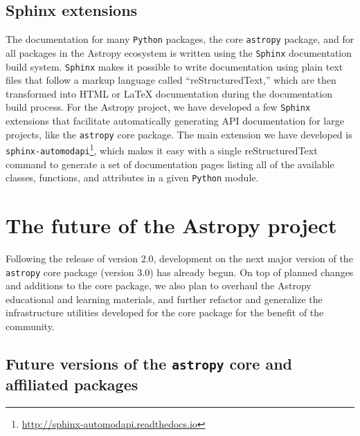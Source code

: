 \documentclass[modern]{aastex61}
\newcommand{\package}[1]{\texttt{#1}\xspace}
\newcommand{\python}{\package{Python}}
\newcommand{\astropy}{Astropy\xspace}
\newcommand{\astropypkg}{\package{astropy}}
\newcommand{\inlinecomment}[2]{\todo[inline]{#1: #2}\xspace}
\begin{document}
\subsection{Sphinx extensions}

The documentation for many \python packages, the core \astropypkg package, and
for all packages in the \astropy ecosystem is written using the
\package{Sphinx} documentation build system.
\package{Sphinx} makes it possible to write documentation using plain text files
that follow a markup language called ``reStructuredText,'' which are then
transformed into HTML or \LaTeX{} documentation during the documentation build
process.
For the \astropy project, we have developed a few \package{Sphinx} extensions
that facilitate automatically generating API documentation for large projects,
like the \astropypkg core package.
The main extension we have developed is
\package{sphinx-automodapi}\footnote{\url{http://sphinx-automodapi.readthedocs.io}},
which makes it easy with a single reStructuredText command to generate a set of
documentation pages listing all of the available classes, functions, and
attributes in a given \python module.



\section{The future of the Astropy project}
\label{sec:future}

Following the release of version 2.0, development on the next major version of
the \astropypkg core package (version 3.0) has already begun.
On top of planned changes and additions to the core package, we also plan to
overhaul the \astropy educational and learning materials, and further refactor
and generalize the infrastructure utilities developed for the core package for
the benefit of the community.


\subsection{Future versions of the \astropypkg core and affiliated packages}
\end{document}
